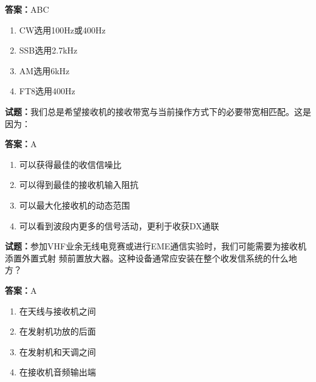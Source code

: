\documentclass{ctexbook}
\begin{document}
\textbf{答案：}ABC 

\begin{enumerate}[leftmargin=3em]
  \item CW选用100Hz或400Hz 

  \item SSB选用2.7kHz 

  \item AM选用6kHz 

  \item FT8选用400Hz 

\end{enumerate}





\vspace{1em}

\textbf{试题：}我们总是希望接收机的接收带宽与当前操作方式下的必要带宽相匹配。这是因为： 

\textbf{答案：}A 

\begin{enumerate}[leftmargin=3em]
  \item 可以获得最佳的收信信噪比 

  \item 可以得到最佳的接收机输入阻抗 

  \item 可以最大化接收机的动态范围 

  \item 可以看到波段内更多的信号活动，更利于收获DX通联 

\end{enumerate}





\vspace{1em}

\textbf{试题：}参加VHF业余无线电竞赛或进行EME通信实验时，我们可能需要为接收机添置外置式射
频前置放大器。这种设备通常应安装在整个收发信系统的什么地方？ 

\textbf{答案：}A 

\begin{enumerate}[leftmargin=3em]
  \item 在天线与接收机之间 

  \item 在发射机功放的后面 

  \item 在发射机和天调之间 

  \item 在接收机音频输出端 

\end{enumerate}
\end{document}
